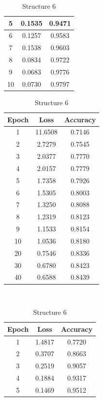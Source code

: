 \documentclass{article}
\begin{document}
\begin{table}[]
\begin{minipage}[b]{0.23\linewidth}
\begin{tabular}{|c|c|c|}
    \hline
    5&0.1535&0.9471\\
    \hline
    6&0.1257&0.9583\\
    \hline
    7&0.1538&0.9603\\
    \hline
    8&0.0834&0.9722\\
    \hline
    9&0.0683&0.9776\\
    \hline
    10&0.0730&0.9797\\
    \hline
  \end{tabular}
  \caption*{Structure 5}
  \end{minipage}
  \hspace{0.5cm}
  \begin{minipage}[b]{0.23\linewidth}
  \tiny
  \begin{tabular}{|c|c|c|}
    \hline
    Epoch&Loss&Accuracy\\
    \hline
    1&11.6508&0.7146\\
    \hline
    2&2.7279&0.7545\\
    \hline
    3&2.0377&0.7770\\
    \hline
    4&2.0157&0.7779\\
    \hline
    5&1.7358&0.7926\\
    \hline
    6&1.5305&0.8003\\
    \hline
    7&1.3250&0.8088\\
    \hline
    8&1.2319&0.8123\\
    \hline
    9&1.1533&0.8154\\
    \hline
    10&1.0536&0.8180\\
    \hline
    20&0.7546&0.8336\\
    \hline
    30&0.6780&0.8423\\
    \hline
    40&0.6588&0.8439\\
    \hline
  \end{tabular}
  \caption*{Structure 6}
  \end{minipage}
  \\
  \begin{minipage}[b]{0.23\linewidth}
  \tiny
  \begin{tabular}{|c|c|c|}
    \hline
    Epoch&Loss&Accuracy\\
    \hline
    1&1.4817&0.7720\\
    \hline
    2&0.3707&0.8663\\
    \hline
    3&0.2519&0.9057\\
    \hline
    4&0.1884&0.9317\\
    \hline
    5&0.1469&0.9512\\

\end{tabular}
\end{minipage}
\end{table}
\end{document}
